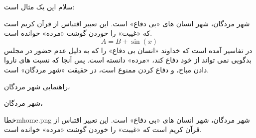 \documentclass{report}
\begin{document}
سلام این یک مثال است:

\begin{note}
شهر مردگان، شهر انسان های «بی دفاع» است. این تعبیر اقتباس از قرآن کریم است که «غیبت» را خوردن گوشت «مرده» خوانده است. 
\begin{equation}
A = B + \sin (x)
\end{equation}
در تفاسیر آمده است که خداوند «انسان بی دفاع» را که به دلیل عدم حضور در مجلس بدگویی نمی تواند از خود دفاع کند، «مرده» دانسته است. پس آنجا که نسبت های ناروا دادن مباح، و دفاع کردن ممنوع است، در حقیقت «شهر مردگان» است.
\end{note}
\begin{note}{راهنمایی}
شهر مردگان،
\end{note}
\begin{note}
شهر مردگان، 
\end{note}
\begin{note}{خطا}{mhome.png}
شهر مردگان، شهر انسان های «بی دفاع» است. این تعبیر اقتباس از قرآن کریم است که «غیبت» را خوردن گوشت «مرده» خوانده است. 
\end{note}
\end{document}
